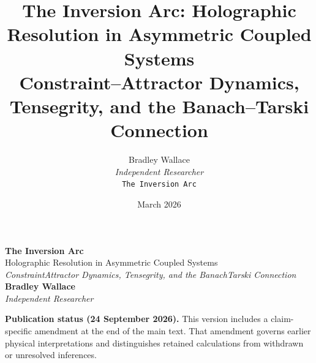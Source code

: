\documentclass[11pt,a4paper]{article}
\title{\textbf{The Inversion Arc: Holographic Resolution in Asymmetric Coupled Systems}\\[0.4em]
       \large Constraint--Attractor Dynamics, Tensegrity, and the Banach--Tarski Connection}
\author{Bradley Wallace\\[0.3em]
        \small \textit{Independent Researcher}\\[0.2em]
        \small \texttt{The Inversion Arc}}
\date{March 2026}
\theoremstyle{plain}
\theoremstyle{definition}
\theoremstyle{remark}
\begin{document}
\begin{titlepage}
\thispagestyle{empty}

\noindent{\color{acsrule}\rule{\textwidth}{0.4pt}}
\vspace{6pt}
\vspace{6pt}
\noindent{\color{acsrule}\rule{\textwidth}{0.4pt}}

\vspace{0.6in}

\begin{center}
  {\Huge\bfseries\color{acsprimary} The Inversion Arc}\\[0.4em]
  {\Large\color{acsslate} Holographic Resolution in Asymmetric Coupled Systems}\\[1.2em]
  {\normalsize\itshape\color{acsslate}
    Constraint\textendash Attractor Dynamics, Tensegrity, and the Banach\textendash Tarski Connection}\\[2.0em]
  {\large\bfseries Bradley Wallace}\\[0.25em]
  {\small\itshape\color{acsslate} Independent Researcher}
\end{center}
\par\smallskip\noindent\textbf{Publication status (24 September 2026).}
This version includes a claim-specific amendment at the end of the main text.
That amendment governs earlier physical interpretations and distinguishes
retained calculations from withdrawn or unresolved inferences.\par\smallskip


\vspace{0.5in}


\end{titlepage}
\end{document}
